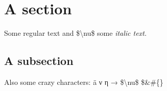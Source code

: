 \documentclass{article}%
\begin{document}
%
\normalsize%
\section{A section}%
\label{sec:A section}%
Some regular text and \$\textbackslash{}nu\$ some %
\textit{italic text. }%
\subsection{A subsection}%
\label{subsec:A subsection}%
Also some crazy characters: ä ν η → \$\textbackslash{}nu\$ \$\&\#\{\}

%
\end{document}
